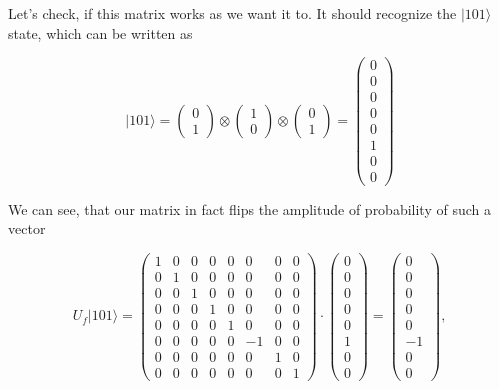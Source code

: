 Let's check, if this matrix works as we want it to. It should recognize the $|101\rangle$ state, which can be written as

\[ |101\rangle = \begin{pmatrix} 0 \\ 1 \end{pmatrix} \otimes \begin{pmatrix} 1 \\ 0 \end{pmatrix} \otimes \begin{pmatrix} 0 \\ 1 \end{pmatrix} = \begin{pmatrix} 0 \\ 0 \\ 0 \\ 0 \\ 0 \\ 1 \\ 0 \\ 0 \end{pmatrix}\]

We can see, that our matrix in fact flips the amplitude of probability of such a vector

\[ U_f |101\rangle = \begin{pmatrix}
1 & 0 & 0 & 0 & 0 & 0 & 0 & 0 \\
0 & 1 & 0 & 0 & 0 & 0 & 0 & 0 \\
0 & 0 & 1 & 0 & 0 & 0 & 0 & 0 \\
0 & 0 & 0 & 1 & 0 & 0 & 0 & 0 \\
0 & 0 & 0 & 0 & 1 & 0 & 0 & 0 \\
0 & 0 & 0 & 0 & 0 & -1 & 0 & 0 \\
0 & 0 & 0 & 0 & 0 & 0 & 1 & 0 \\
0 & 0 & 0 & 0 & 0 & 0 & 0 & 1
\end{pmatrix} \cdot \begin{pmatrix} 0 \\ 0 \\ 0 \\ 0 \\ 0 \\ 1 \\ 0 \\ 0 \end{pmatrix} = \begin{pmatrix} 0 \\ 0 \\ 0 \\ 0 \\ 0 \\ -1 \\ 0 \\ 0 \end{pmatrix},\]

